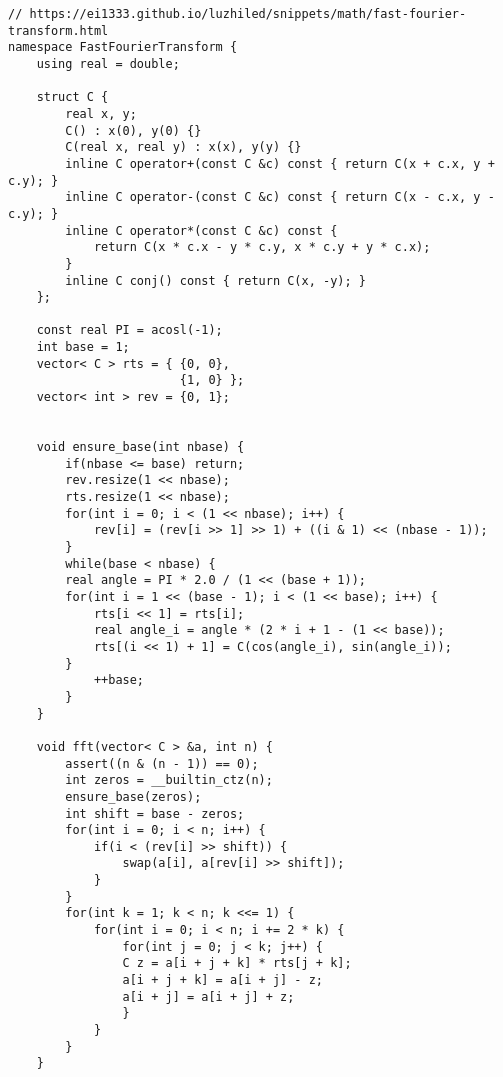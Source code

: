 \documentclass[11pt,a4paper]{jsarticle}
\newcommand{\minititle}[1]{\medskip{\large \sf #1}\medskip}
\begin{document}
\minititle{FFT}
\begin{lstlisting}
// https://ei1333.github.io/luzhiled/snippets/math/fast-fourier-transform.html
namespace FastFourierTransform {
    using real = double;

    struct C {
        real x, y;
        C() : x(0), y(0) {}
        C(real x, real y) : x(x), y(y) {}
        inline C operator+(const C &c) const { return C(x + c.x, y + c.y); }
        inline C operator-(const C &c) const { return C(x - c.x, y - c.y); }
        inline C operator*(const C &c) const {
            return C(x * c.x - y * c.y, x * c.y + y * c.x);
        }
        inline C conj() const { return C(x, -y); }
    };

    const real PI = acosl(-1);
    int base = 1;
    vector< C > rts = { {0, 0},
                        {1, 0} };
    vector< int > rev = {0, 1};


    void ensure_base(int nbase) {
        if(nbase <= base) return;
        rev.resize(1 << nbase);
        rts.resize(1 << nbase);
        for(int i = 0; i < (1 << nbase); i++) {
            rev[i] = (rev[i >> 1] >> 1) + ((i & 1) << (nbase - 1));
        }
        while(base < nbase) {
        real angle = PI * 2.0 / (1 << (base + 1));
        for(int i = 1 << (base - 1); i < (1 << base); i++) {
            rts[i << 1] = rts[i];
            real angle_i = angle * (2 * i + 1 - (1 << base));
            rts[(i << 1) + 1] = C(cos(angle_i), sin(angle_i));
        }
            ++base;
        }
    }

    void fft(vector< C > &a, int n) {
        assert((n & (n - 1)) == 0);
        int zeros = __builtin_ctz(n);
        ensure_base(zeros);
        int shift = base - zeros;
        for(int i = 0; i < n; i++) {
            if(i < (rev[i] >> shift)) {
                swap(a[i], a[rev[i] >> shift]);
            }
        }
        for(int k = 1; k < n; k <<= 1) {
            for(int i = 0; i < n; i += 2 * k) {
                for(int j = 0; j < k; j++) {
                C z = a[i + j + k] * rts[j + k];
                a[i + j + k] = a[i + j] - z;
                a[i + j] = a[i + j] + z;
                }
            }
        }
    }


\end{lstlisting}
\end{document}
